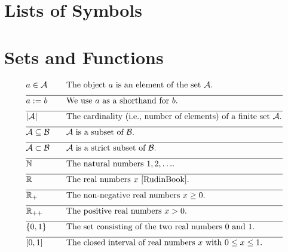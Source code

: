 
\section*{Lists of Symbols}

\vspace*{-2mm}
\section*{Sets and Functions} 

\begin{align} 
	&a \in \mathcal{A} & \quad & \parbox{.75\textwidth}{The object $a$ is an element of the set $\mathcal{A}$.} \nonumber \\[2mm] \hline \nonumber\\[-5mm]
	&a \defeq b & \quad & \mbox{We use $a$ as a shorthand for $b$. }\nonumber \\[2mm] \hline \nonumber\\[-5mm]
	&|\mathcal{A}| & \quad & \mbox{The cardinality (i.e., number of elements) of a finite set $\mathcal{A}$.}\nonumber \\[2mm] \hline \nonumber\\[-5mm]
	&\mathcal{A} \subseteq \mathcal{B}& \quad & \mbox{$\mathcal{A}$ is a subset of $\mathcal{B}$.}\nonumber \\[2mm] \hline \nonumber\\[-5mm]
	&\mathcal{A} \subset \mathcal{B}& \quad & \mbox{$\mathcal{A}$ is a strict subset of $\mathcal{B}$.} \nonumber \\[2mm] \hline \nonumber\\[-5mm]
	&\mathbb{N} & \quad & \mbox{The natural numbers $1,2,\ldots$.}\nonumber \\[2mm] \hline \nonumber\\[-5mm]
	&\mathbb{R}  &\quad &\mbox{The real numbers $x$ \cite{RudinBook}.} \nonumber \\[2mm] \hline \nonumber\\[-5mm]
	&\mathbb{R}_{+}  &\quad &\mbox{The non-negative real numbers $x\geq0$.}\nonumber \\[2mm] \hline \nonumber\\[-5mm]
	&\mathbb{R}_{++}  &\quad &\mbox{The positive real numbers $x> 0$.} \nonumber \\[2mm] \hline \nonumber\\[-5mm]
	&\{0,1\}& \quad & \mbox{The set consisting of the two real numbers $0$ and $1$.} \nonumber \\[2mm] \hline \nonumber\\[-5mm]
	&[0,1] &\quad &\mbox{The closed interval of real numbers $x$ with $0 \leq x \leq 1$. }\nonumber 
\end{align} 


